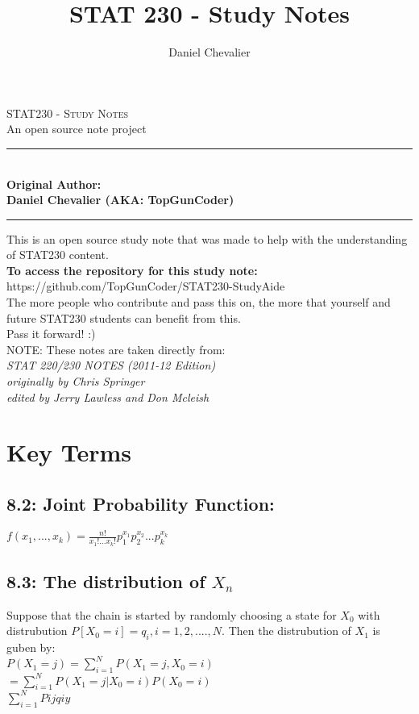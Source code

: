 \documentclass[11pt]{article}
\author{Daniel Chevalier}
\title{STAT 230 - Study Notes}
\newcommand{\HRule}{\rule{\linewidth}{0.5mm}}
\begin{document}
	\begin{titlepage}
		\begin{center}
			\textsc{\LARGE STAT230 - Study Notes}\\
			{\Large An open source note project}\\

			
			\HRule\\
				{\large \bf Original Author:\\ Daniel Chevalier (AKA: TopGunCoder)}
			\HRule
			
			This is an open source study note that was made to help with the understanding of STAT230 content.\\
			
			{\large \bf To access the repository for this study note:}\\
			https://github.com/TopGunCoder/STAT230-StudyAide\\
			The more people who contribute and pass this on, the more that yourself and future STAT230 students can benefit from this.\\
			Pass it forward! :)\\
			\vfill
			NOTE: These notes are taken directly from: \\
			\emph{STAT 220/230 NOTES (2011-12 Edition)\\
			originally by Chris Springer\\
			edited by Jerry Lawless and Don Mcleish}
		\end{center}
	\end{titlepage}

\newpage
\section*{Key Terms}
	\subsection*{8.2: Joint Probability Function:}
		$f(x_1,...,x_k)=\frac{n!}{x_1!...x_k!}p_1^{x_1}p_2^{x_2} ...p_k^{x_k}$
	
	\subsection*{8.3: The distribution of $X_n$}
		Suppose that the chain is started by randomly choosing a state for $X_0$ with distrubution $P[X_0=i]=q_i,i=1,2,....,N$. Then the distrubution of $X_1$ is guben by:\\
		$P(X_1=j)=\sum_{i=1}^{N}P(X_1=j,X_0=i)$\\
		$=\sum^N_{i=1}P(X_1=j|X_0=i)P(X_0=i)$\\
		$\sum_{i=1}^N Pijqiy$
\end{document}
